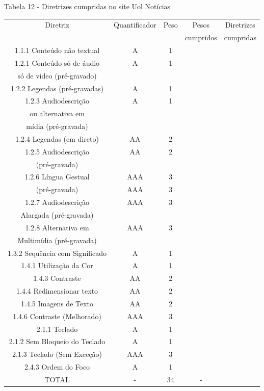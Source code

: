 \documentclass[a4paper]{article}
\begin{document}
\begin{titlepage}
Tabela 12 - Diretrizes cumpridas no site Uol Notícias\\[-1cm]
\begin{center}
	\fontsize{8pt}{8pt}\selectfont	
	\begin{longtable}{|c|c|c|c|c|}
		\hline
		Diretriz & Quantificador & Peso & Pesos & Diretrizes\\
		& & & cumpridos & cumpridas\\
		\hline
		1.1.1 Conteúdo não textual & A & 1 & & \\
		\hline
		1.2.1 Conteúdo só de áudio & A & 1 & & \\
		só de vídeo (pré-gravado) & & & & \\
		\hline
		1.2.2 Legendas (pré-gravadas) & A & 1 & & \\
		\hline
		1.2.3 Audiodescrição & A & 1 & & \\
		ou alternativa em & & & & \\
		mídia (pré-gravada) & & & & \\
		\hline
		1.2.4 Legendas (em direto) & AA & 2 & & \\
		\hline
		1.2.5 Audiodescrição & AA & 2 & & \\
		(pré-gravada) & & & & \\
		\hline
		1.2.6 Língua Gestual & AAA & 3 & & \\
		(pré-gravada) & AAA & 3 & & \\
		\hline
		1.2.7 Audiodescrição & AAA & 3 & & \\
		Alargada (pré-gravada) & & & & \\
		\hline
		1.2.8 Alternativa em & AAA & 3 & & \\
		Multimídia (pré-gravada) & & & & \\
		\hline
		1.3.2 Sequência com Significado & A & 1 & & \\
		\hline
		1.4.1 Utilização da Cor & A & 1 & & \\
		\hline
		1.4.3 Contraste & AA & 2 & & \\
		\hline
		1.4.4 Redimensionar texto & AA & 2 & & \\
		\hline
		1.4.5 Imagens de Texto & AA & 2 & & \\
		\hline
		1.4.6 Contraste (Melhorado) & AAA & 3 & & \\
		\hline
		2.1.1 Teclado & A & 1 & & \\
		\hline
		2.1.2 Sem Bloqueio do Teclado & A & 1 & & \\
		\hline
		2.1.3 Teclado (Sem Exceção) & AAA & 3 & & \\
		\hline
		2.4.3 Ordem do Foco & A & 1 & & \\
		\hline
		TOTAL & - & 34 & - & \\
		\hline
	\end{longtable}
\end{center}


\end{titlepage}
\end{document}
